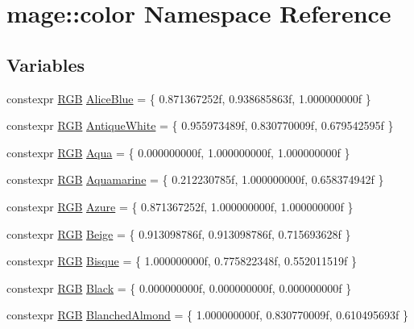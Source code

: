 \hypertarget{namespacemage_1_1color}{}\section{mage\+:\+:color Namespace Reference}
\label{namespacemage_1_1color}
\subsection*{Variables}
\begin{DoxyCompactItemize}
\item 
constexpr \mbox{\hyperlink{structmage_1_1_r_g_b}{R\+GB}} \mbox{\hyperlink{namespacemage_1_1color_abd4f16c016b0f4447d08269b0ffb1332}{Alice\+Blue}} = \{ 0.\+871367252f, 0.\+938685863f, 1.\+000000000f \}
\item 
constexpr \mbox{\hyperlink{structmage_1_1_r_g_b}{R\+GB}} \mbox{\hyperlink{namespacemage_1_1color_a66ba58abef7d938d58b25b45ebfec98f}{Antique\+White}} = \{ 0.\+955973489f, 0.\+830770009f, 0.\+679542595f \}
\item 
constexpr \mbox{\hyperlink{structmage_1_1_r_g_b}{R\+GB}} \mbox{\hyperlink{namespacemage_1_1color_a1c3b68d6209b49526a3ba6d27f4958d9}{Aqua}} = \{ 0.\+000000000f, 1.\+000000000f, 1.\+000000000f \}
\item 
constexpr \mbox{\hyperlink{structmage_1_1_r_g_b}{R\+GB}} \mbox{\hyperlink{namespacemage_1_1color_aeb7c11e0c59678c6ddcc4e8379c5a951}{Aquamarine}} = \{ 0.\+212230785f, 1.\+000000000f, 0.\+658374942f \}
\item 
constexpr \mbox{\hyperlink{structmage_1_1_r_g_b}{R\+GB}} \mbox{\hyperlink{namespacemage_1_1color_a002c51cadb3b21c6a0c3492303207ee3}{Azure}} = \{ 0.\+871367252f, 1.\+000000000f, 1.\+000000000f \}
\item 
constexpr \mbox{\hyperlink{structmage_1_1_r_g_b}{R\+GB}} \mbox{\hyperlink{namespacemage_1_1color_a26bfb42ab556acd93a90a8c16f0d6c28}{Beige}} = \{ 0.\+913098786f, 0.\+913098786f, 0.\+715693628f \}
\item 
constexpr \mbox{\hyperlink{structmage_1_1_r_g_b}{R\+GB}} \mbox{\hyperlink{namespacemage_1_1color_a475426fc358c0aa9f4e222003a273a1d}{Bisque}} = \{ 1.\+000000000f, 0.\+775822348f, 0.\+552011519f \}
\item 
constexpr \mbox{\hyperlink{structmage_1_1_r_g_b}{R\+GB}} \mbox{\hyperlink{namespacemage_1_1color_a1395fb0c23b604e389b2d81fd0670bdc}{Black}} = \{ 0.\+000000000f, 0.\+000000000f, 0.\+000000000f \}
\item 
constexpr \mbox{\hyperlink{structmage_1_1_r_g_b}{R\+GB}} \mbox{\hyperlink{namespacemage_1_1color_a1ffaefe9ca0592fa48fa321b694fd489}{Blanched\+Almond}} = \{ 1.\+000000000f, 0.\+830770009f, 0.\+610495693f \}

\end{DoxyCompactItemize}
